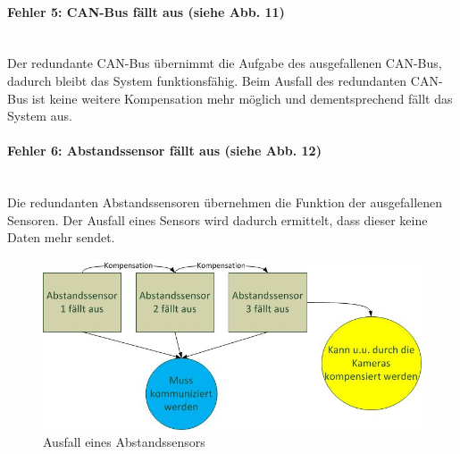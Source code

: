 \paragraph{\textbf{Fehler 5: CAN-Bus fällt aus (siehe Abb. 11)}}$\;$\\
Der redundante CAN-Bus übernimmt die Aufgabe des ausgefallenen CAN-Bus, dadurch bleibt das System funktionsfähig.
Beim Ausfall des redundanten CAN-Bus ist keine weitere Kompensation mehr möglich und dementsprechend fällt das System aus.

\paragraph{\textbf{Fehler 6: Abstandssensor fällt aus (siehe Abb. 12)}}$\;$\\
Die redundanten Abstandssensoren übernehmen die Funktion der ausgefallenen Sensoren.
Der Ausfall eines Sensors wird dadurch ermittelt, dass dieser keine Daten mehr sendet.
\begin{figure}[H]
\centering
\includegraphics[width=0.7\linewidth]{Bilder/FaTNet_abstandssensoredundanz}
\caption{Ausfall eines Abstandssensors}
\label{fig:abstandssensorredundanz}
\end{figure}
